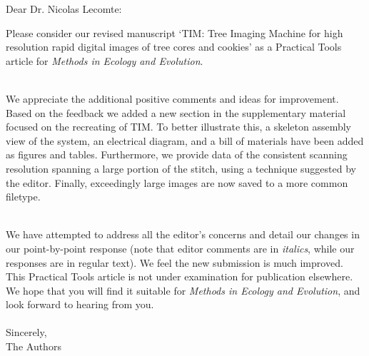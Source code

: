 \documentclass[11pt,a4paper]{letter}
\begin{document}
\begin{letter}{}

\opening{Dear Dr. Nicolas Lecomte:}

\noindent Please consider our revised manuscript `TIM: Tree Imaging Machine for high resolution rapid digital images of tree cores and cookies' as a Practical Tools article for \emph{Methods in Ecology and Evolution}. 

\vspace{1.5ex}\\
We appreciate the additional positive comments and ideas for improvement. Based on the feedback we added a new section in the supplementary material focused on the recreating of TIM. To better illustrate this, a skeleton assembly view of the system, an electrical diagram, and a bill of materials have been added as figures and tables. Furthermore, we provide data of the consistent scanning resolution spanning a large portion of the stitch, using a technique suggested by the editor. Finally, exceedingly large images are now saved to a more common filetype. 

\vspace{1.5ex}\\
We have attempted to address all the editor's concerns and detail our changes in our point-by-point response (note that editor comments are in \emph{italics}, while our responses are in regular text). We feel the new submission is much improved. This Practical Tools article is not under examination for publication elsewhere. We hope that you will find it suitable for \emph{Methods in Ecology and Evolution}, and look forward to hearing from you.
\\\vspace{-1ex}\\
\noindent Sincerely,\\

 
\noindent The Authors


\end{letter}
\end{document}
